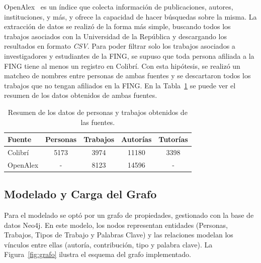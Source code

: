 \documentclass[journal]{IEEEtran}
\begin{document}
OpenAlex~\cite{Priem2022OpenAlex} es un índice que colecta información de publicaciones, autores, instituciones, y más, y ofrece la capacidad de hacer búsquedas sobre la misma. La extracción de datos se realizó de la forma más simple, buscando todos los trabajos asociados con la Universidad de la República y descargando los resultados en formato \emph{CSV}. Para poder filtrar solo los trabajos asociados a investigadores y estudiantes de la FING, se supuso que toda persona afiliada a la FING tiene al menos un registro en Colibrí. Con esta hipótesis, se realizó un matcheo de nombres entre personas de ambas fuentes y se descartaron todos los trabajos que no tengan afiliados en la FING. En la Tabla~\ref{tab:datos} se puede ver el resumen de los datos obtenidos de ambas fuentes.

\begin{table}[h]
	\centering
	\begin{tabular}{l|c|c|c|c}
		\toprule
		\textbf{Fuente} & \textbf{Personas} & \textbf{Trabajos} & \textbf{Autorías} & \textbf{Tutorías} \\
		\midrule
		Colibrí         & 5173              & 3974              & 11180             & 3398              \\
		OpenAlex        & -                 & 8123              & 14596             & -                 \\
		\midrule
	\end{tabular}
	\caption{Resumen de los datos de personas y trabajos obtenidos de las fuentes.}
	\label{tab:datos}
\end{table}

\subsection{Modelado y Carga del Grafo}

Para el modelado se optó por un grafo de propiedades, gestionado con la base de datos Neo4j. En este modelo, los nodos representan entidades (Personas, Trabajos, Tipos de Trabajo y Palabras Clave) y las relaciones modelan los vínculos entre ellas (autoría, contribución, tipo y palabra clave). La Figura~\ref{fig:grafo} ilustra el esquema del grafo implementado.
\end{document}
